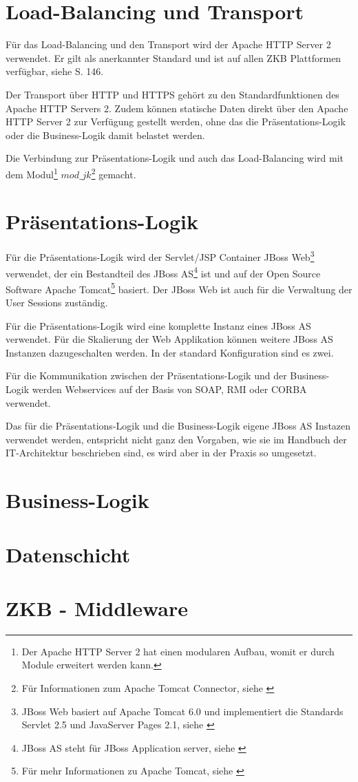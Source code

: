   \section{Load-Balancing und Transport}
  
  Für das Load-Balancing und den Transport wird der Apache HTTP Server 2
  verwendet. Er gilt als anerkannter Standard und ist auf allen ZKB Plattformen
  verfügbar, siehe \cite{ZkbHandbuchDerItArchitektur} S. 146.
  
  Der Transport über \ac{HTTP} und \ac{HTTPS} gehört zu den Standardfunktionen
  des Apache HTTP Servers 2. Zudem können statische Daten direkt über den Apache HTTP
  Server 2 zur Verfügung gestellt werden, ohne das die Präsentations-Logik oder
  die Business-Logik damit belastet werden.
  
  Die Verbindung zur Präsentations-Logik und auch das Load-Balancing wird mit
  dem Modul\footnote{Der Apache HTTP Server 2 hat einen modularen Aufbau, womit
  er durch Module erweitert werden kann.} \(mod\_jk\)\footnote{Für
  Informationen zum Apache Tomcat Connector, siehe \cite{ModJk}} gemacht.
  
  \section{Präsentations-Logik}
  
  Für die Präsentations-Logik wird der Servlet/JSP Container JBoss
  Web\footnote{JBoss Web basiert auf Apache Tomcat 6.0 und implementiert die
  Standards Servlet 2.5 und JavaServer Pages 2.1, siehe \cite{JBossWeb}}
  verwendet, der ein Bestandteil des JBoss AS\footnote{JBoss AS steht für JBoss
  Application server, siehe \cite{JBossAS}} ist und auf der Open Source Software
  Apache Tomcat\footnote{Für mehr Informationen zu Apache Tomcat, siehe
  \cite{ApacheTomcat}} basiert. Der JBoss Web ist auch für die Verwaltung der
  User Sessions zuständig.
  
  Für die Präsentations-Logik wird eine komplette Instanz eines JBoss AS
  verwendet. Für die Skalierung der Web Applikation können weitere
  JBoss AS Instanzen dazugeschalten werden. In der standard Konfiguration sind
  es zwei.
  
  Für die Kommunikation zwischen der Präsentations-Logik und der Business-Logik
  werden Webservices auf der Basis von \ac{SOAP}, \ac{RMI} oder \ac{CORBA}
  verwendet.
  
  Das für die Präsentations-Logik und die Business-Logik eigene JBoss AS
  Instazen verwendet werden, entspricht nicht ganz den Vorgaben, wie sie
  im Handbuch der IT-Architektur beschrieben sind, es wird aber in der Praxis so
  umgesetzt.
    
  \section{Business-Logik}
  
  
  
  \section{Datenschicht}
  
  \section{ZKB - Middleware}

